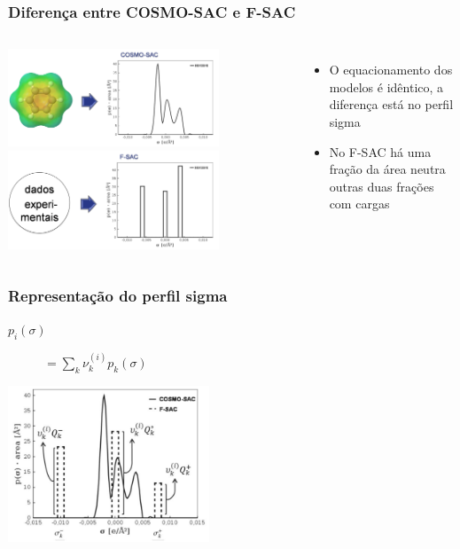 \documentclass[aspectratio=169]{beamer}
\begin{document}
\begin{frame}
\frametitle{Diferença entre COSMO-SAC e F-SAC}
\begin{columns}[c]
\begin{center}
  \includegraphics[width=0.75\textwidth]{img/perfil1}\\
  \includegraphics[width=0.75\textwidth]{img/perfil2}
\end{center}
\pause
\begin{itemize}
  	\item O equacionamento dos modelos é idêntico, a diferença
  		está no perfil sigma
    \item No F-SAC há uma fração da área neutra
    	outras duas frações com cargas
\end{itemize}
\end{columns}
\end{frame}

\begin{frame}
  \frametitle{Representação do perfil sigma}
  \begin{description}
	\item [$p_i(\sigma)$] $= \sum_k{\nu_k^{(i)}p_k(\sigma)}$
 	\end{description}
  \begin{center}
  \includegraphics[width=0.45\textwidth]{img/perfil_fsac}
  \end{center}
\end{frame}
\end{document}
